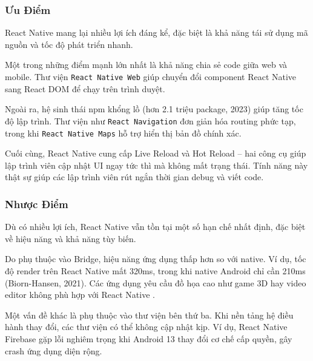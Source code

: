 \subsubsection{Ưu Điểm}
React Native mang lại nhiều lợi ích đáng kể, đặc biệt là khả năng tái sử dụng mã nguồn và tốc độ phát triển nhanh.

\vspace{0.5em}

Một trong những điểm mạnh lớn nhất là khả năng chia sẻ code giữa web và mobile. Thư viện \texttt{React Native Web} giúp chuyển đổi component React Native sang React DOM để chạy trên trình duyệt.

\vspace{0.5em}

Ngoài ra, hệ sinh thái npm khổng lồ (hơn 2.1 triệu package, 2023) giúp tăng tốc độ lập trình. Thư viện như \texttt{React Navigation} đơn giản hóa routing phức tạp, trong khi \texttt{React Native Maps} hỗ trợ hiển thị bản đồ chính xác.

\vspace{0.5em}

Cuối cùng, React Native cung cấp Live Reload và Hot Reload – hai công cụ giúp lập trình viên cập nhật UI ngay tức thì mà không mất trạng thái. Tính năng này thật sự giúp các lập trình viên rút ngắn thời gian debug và viết code.

\subsubsection{Nhược Điểm}

Dù có nhiều lợi ích, React Native vẫn tồn tại một số hạn chế nhất định, đặc biệt về hiệu năng và khả năng tùy biến.

\vspace{0.5em}

Do phụ thuộc vào Bridge, hiệu năng ứng dụng thấp hơn so với native. Ví dụ, tốc độ render trên React Native mất 320ms, trong khi native Android chỉ cần 210ms (Biorn-Hansen, 2021). Các ứng dụng yêu cầu đồ họa cao như game 3D hay video editor không phù hợp với React Native \cite{quoraunity}.

\vspace{0.5em}

Một vấn đề khác là phụ thuộc vào thư viện bên thứ ba. Khi nền tảng hệ điều hành thay đổi, các thư viện có thể không cập nhật kịp. Ví dụ, React Native Firebase gặp lỗi nghiêm trọng khi Android 13 thay đổi cơ chế cấp quyền, gây crash ứng dụng diện rộng.

